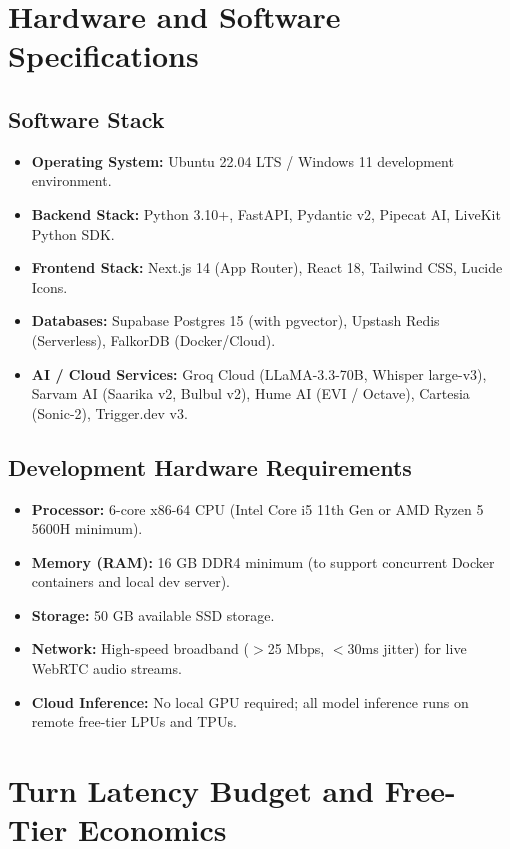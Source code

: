 \documentclass[12pt,a4paper]{article}
\begin{document}
\section{Hardware and Software Specifications}

\subsection{Software Stack}
\begin{itemize}[leftmargin=*]
    \item \textbf{Operating System:} Ubuntu 22.04 LTS / Windows 11 development environment.
    \item \textbf{Backend Stack:} Python 3.10+, FastAPI, Pydantic v2, Pipecat AI, LiveKit Python SDK.
    \item \textbf{Frontend Stack:} Next.js 14 (App Router), React 18, Tailwind CSS, Lucide Icons.
    \item \textbf{Databases:} Supabase Postgres 15 (with pgvector), Upstash Redis (Serverless), FalkorDB (Docker/Cloud).
    \item \textbf{AI / Cloud Services:} Groq Cloud (LLaMA-3.3-70B, Whisper large-v3), Sarvam AI (Saarika v2, Bulbul v2), Hume AI (EVI / Octave), Cartesia (Sonic-2), Trigger.dev v3.
\end{itemize}

\subsection{Development Hardware Requirements}
\begin{itemize}[leftmargin=*]
    \item \textbf{Processor:} 6-core x86-64 CPU (Intel Core i5 11th Gen or AMD Ryzen 5 5600H minimum).
    \item \textbf{Memory (RAM):} 16 GB DDR4 minimum (to support concurrent Docker containers and local dev server).
    \item \textbf{Storage:} 50 GB available SSD storage.
    \item \textbf{Network:} High-speed broadband ($>$25 Mbps, $<$30ms jitter) for live WebRTC audio streams.
    \item \textbf{Cloud Inference:} No local GPU required; all model inference runs on remote free-tier LPUs and TPUs.
\end{itemize}

\section{Turn Latency Budget and Free-Tier Economics}
\end{document}
